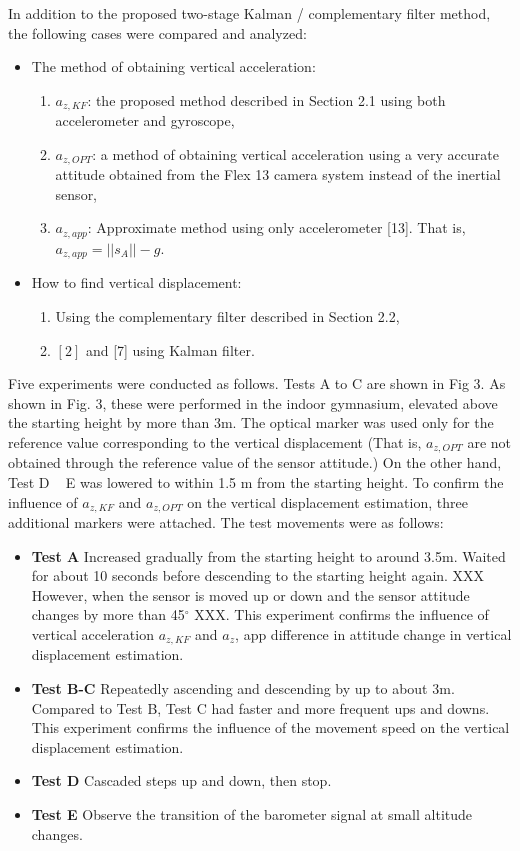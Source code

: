 \documentclass[10pt,journal,compsoc]{IEEEtran}
\begin{document}
In addition to the proposed two-stage Kalman / complementary filter method,
the following cases were compared and analyzed:

\begin{itemize}
\item The method of obtaining vertical acceleration: 
\begin{enumerate}
\item $a_{z,KF}$: the proposed method described in Section 2.1 using both accelerometer and gyroscope,
\item $a_{z,OPT}$: a method of obtaining vertical acceleration using a very accurate attitude obtained from the 
  Flex 13 camera system instead of the inertial sensor,
\item $a_{z,app}$: Approximate method using only accelerometer [13]. That is, $a_{z,app} = ||s_A|| - g$.
\end{enumerate}
\item How to find vertical displacement:
\begin{enumerate}
\item Using the complementary filter described in Section 2.2,
\item $[2]$ and [7] using Kalman filter.
\end{enumerate}
\end{itemize}

Five experiments were conducted as follows. Tests A to C are shown in Fig 3. As
shown in Fig. 3, these were performed in the indoor gymnasium, elevated above the
starting height by more than 3m. The optical marker was used only for the
reference value corresponding to the vertical displacement (That is, $a_{z,OPT}$
are not obtained through the reference value of the sensor attitude.) On the
other hand, Test D ~ E was lowered to within 1.5 m from the starting height.
To confirm the influence of $a_{z,KF}$ and $a_{z,OPT}$ on the vertical displacement
estimation, three additional markers were attached.  The test movements were as follows:
\begin{itemize}
    \item \textbf{Test A} Increased gradually from the starting height to around 3.5m.
         Waited for about 10 seconds before descending to the starting height again.
         XXX However, when the sensor is moved up or down and the sensor attitude changes by more than 
         45$^\circ$ XXX.  This experiment confirms the influence of vertical
         acceleration $a_{z,KF}$ and $a_z$, app difference in attitude change in
         vertical displacement estimation.
    \item \textbf{Test B-C} Repeatedly ascending and descending by up to about 3m. Compared to Test B, 
        Test C had faster and more frequent ups and downs. This experiment
        confirms the influence of the movement speed on the vertical displacement
        estimation.
    \item \textbf{Test D} Cascaded steps up and down, then stop.
    \item \textbf{Test E} Observe the transition of the barometer signal at small altitude changes.
\end{itemize}
\end{document}
